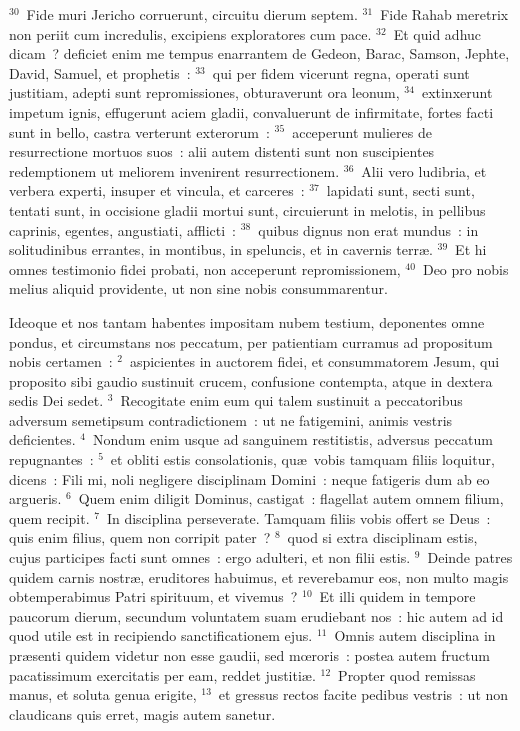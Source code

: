 ${}^{30}$~Fide muri Jericho corruerunt, circuitu dierum septem.
${}^{31}$~Fide Rahab meretrix non periit cum incredulis, excipiens exploratores cum pace.
${}^{32}$~Et quid adhuc dicam~? deficiet enim me tempus enarrantem de Gedeon, Barac, Samson, Jephte, David, Samuel, et prophetis~:
${}^{33}$~qui per fidem vicerunt regna, operati sunt justitiam, adepti sunt repromissiones, obturaverunt ora leonum,
${}^{34}$~extinxerunt impetum ignis, effugerunt aciem gladii, convaluerunt de infirmitate, fortes facti sunt in bello, castra verterunt exterorum~:
${}^{35}$~acceperunt mulieres de resurrectione mortuos suos~: alii autem distenti sunt non suscipientes redemptionem ut meliorem invenirent resurrectionem.
${}^{36}$~Alii vero ludibria, et verbera experti, insuper et vincula, et carceres~:
${}^{37}$~lapidati sunt, secti sunt, tentati sunt, in occisione gladii mortui sunt, circuierunt in melotis, in pellibus caprinis, egentes, angustiati, afflicti~:
${}^{38}$~quibus dignus non erat mundus~: in solitudinibus errantes, in montibus, in speluncis, et in cavernis terr\ae .
${}^{39}$~Et hi omnes testimonio fidei probati, non acceperunt repromissionem,
${}^{40}$~Deo pro nobis melius aliquid providente, ut non sine nobis consummarentur.

\lettrine[lines=3,image=true,loversize=0.05,lraise=-0.03]{I}{}deoque et nos tantam habentes impositam nubem testium, deponentes omne pondus, et circumstans nos peccatum, per patientiam curramus ad propositum nobis certamen~:
${}^{2}$~aspicientes in auctorem fidei, et consummatorem Jesum, qui proposito sibi gaudio sustinuit crucem, confusione contempta, atque in dextera sedis Dei sedet.
${}^{3}$~Recogitate enim eum qui talem sustinuit a peccatoribus adversum semetipsum contradictionem~: ut ne fatigemini, animis vestris deficientes.
${}^{4}$~Nondum enim usque ad sanguinem restitistis, adversus peccatum repugnantes~:
${}^{5}$~et obliti estis consolationis, qu\ae\ vobis tamquam filiis loquitur, dicens~: Fili mi, noli negligere disciplinam Domini~: neque fatigeris dum ab eo argueris.
${}^{6}$~Quem enim diligit Dominus, castigat~: flagellat autem omnem filium, quem recipit.
${}^{7}$~In disciplina perseverate. Tamquam filiis vobis offert se Deus~: quis enim filius, quem non corripit pater~?
${}^{8}$~quod si extra disciplinam estis, cujus participes facti sunt omnes~: ergo adulteri, et non filii estis.
${}^{9}$~Deinde patres quidem carnis nostr\ae , eruditores habuimus, et reverebamur eos, non multo magis obtemperabimus Patri spirituum, et vivemus~?
${}^{10}$~Et illi quidem in tempore paucorum dierum, secundum voluntatem suam erudiebant nos~: hic autem ad id quod utile est in recipiendo sanctificationem ejus.
${}^{11}$~Omnis autem disciplina in pr\ae senti quidem videtur non esse gaudii, sed mœroris~: postea autem fructum pacatissimum exercitatis per eam, reddet justiti\ae .
${}^{12}$~Propter quod remissas manus, et soluta genua erigite,
${}^{13}$~et gressus rectos facite pedibus vestris~: ut non claudicans quis erret, magis autem sanetur.


